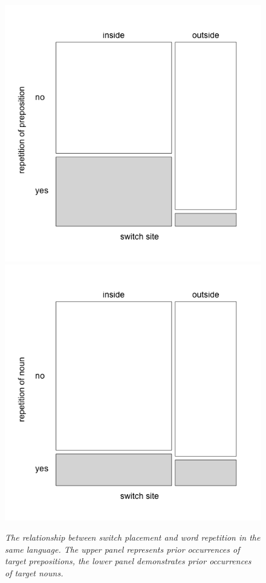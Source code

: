 \begin{figure}
	\centering
	\includegraphics[scale=0.3]{figures/5-Figure_4a.png}	%
	\includegraphics[scale=0.3]{figures/5-Figure_4b.png}	
		\caption{\textit{The relationship between switch placement and word repetition in the same language. The upper panel represents prior occurrences of target prepositions, the lower panel demonstrates prior occurrences of target nouns.}}
	\label{fig:5:4}
\end{figure}

